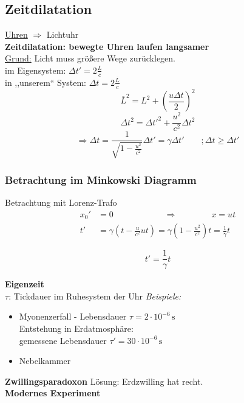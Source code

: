 \documentclass[titlepage,11pt,a4paper,ngerman]{report}
\newcommand{\tx}[1]{\textrm{#1}}
\newcommand{\lcom}[1]{\color{MidnightBlue}#1\color{black}}
\newcommand{\frbox}[2]{\begin{tcolorbox}[colback=white,colframe=red!75!black,fonttitle=\bfseries,title=#1]#2\end{tcolorbox}}
\begin{document}
\subsection{Zeitdilatation}
\underline{Uhren} $ \Rightarrow $ Lichtuhr\\
\textbf{Zeitdilatation: bewegte Uhren laufen langsamer}\\
\underline{Grund:} Licht muss größere Wege zurücklegen.\\[5pt]
im Eigensystem: $ \Delta t' = 2 \frac{L}{c} $\\
in ,,unserem`` System: $ \Delta t = 2 \frac{\overline{L}}{c} $
\begin{equation*}
\overline{L}^2 = L^2 + \left(\frac{u \Delta t}{2}\right)^2
\end{equation*}
\begin{equation*}
\Delta t^2 = \Delta t'^2 + \frac{u^2}{c^2} \Delta t^2
\end{equation*}
\begin{equation*}
\Rightarrow \Delta t = \frac{1}{\sqrt{1 - \frac{u^2}{c^2}}} \Delta t' = \gamma \Delta t' \qquad ; \Delta t \geq \Delta t'
\end{equation*}

\subsubsection{Betrachtung im Minkowski Diagramm}
Betrachtung mit Lorenz-Trafo
\begin{align*}
x_0' &= 0 \qquad  \qquad \qquad  \Rightarrow  \qquad \qquad  x = ut \\
t'\phantom{_0} &= \gamma \left(t - \frac{u}{c^2}  u t\right) = \gamma \left(1 - \frac{u^2}{c^2}\right) t = \frac{1}{\gamma} t
\end{align*}
\frbox{Zeitdilatation}{\begin{equation*}
	t' = \frac{1}{\gamma} t
	\end{equation*}}
\textbf{Eigenzeit}\\
$ \tau $: Tickdauer im Ruhesystem der Uhr
\emph{Beispiele:}
\begin{itemize}
	\item Myonenzerfall - Lebensdauer $ \tau = 2 \cdot 10^{-6} \, \tx{s} $\\
	Entstehung in Erdatmosphäre:\\
	gemessene Lebensdauer $ \tau' = 30 \cdot 10^{-6} \, \tx{s} $
	\item Nebelkammer
\end{itemize}
\textbf{Zwillingsparadoxon}
Lösung: \lcom{Erdzwilling hat recht.}\\
\textbf{Modernes Experiment}
\end{document}
